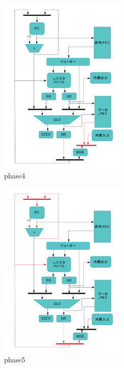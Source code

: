 \documentclass{jsreport}
\begin{document}
\begin{figure}[h]
\centering
\includegraphics[width=60mm]{figures/phase4.png}
\caption{phase4}
\label{fig:phase4}
\end{figure}
\begin{figure}[h]
\centering
\includegraphics[width=60mm]{figures/phase5.png}
\caption{phase5}
\label{fig:phase5}
\end{figure}

\end{document}
